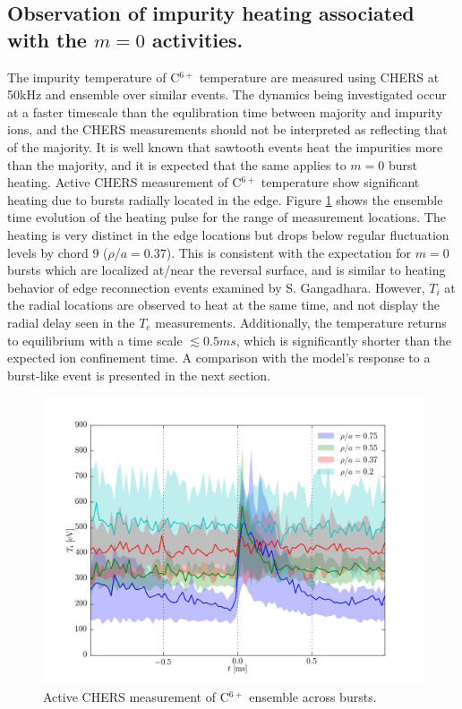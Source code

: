 \begin{refsection}
\section{Observation of impurity heating associated with the $m = 0$ activities.}

The impurity temperature of C$^{6+}$ temperature are measured using CHERS at 50kHz and ensemble over similar events.
The dynamics being investigated occur at a faster timescale than the equlibration time between majority and impurity ions, and the CHERS measurements should not be interpreted as reflecting that of the majority. It is well known that sawtooth events heat the impurities more than the majority, and it is expected that the same applies to $m = 0$ burst heating.
Active CHERS measurement of C$^{6+}$ temperature show significant heating due to bursts radially located in the edge. Figure \ref{fig:m0_heating} shows the ensemble time evolution of the heating pulse for the range of measurement locations. The heating is very distinct in the edge locations but drops below regular fluctuation levels by chord 9 ($\rho/a = 0.37$). This is consistent with the expectation for $m = 0$ bursts which are localized at/near the reversal surface, and is similar to heating behavior of edge reconnection events examined by S. Gangadhara\cite{Gangadhara2008}. However, $T_i$ at the radial locations are observed to heat at the same time, and not display the radial delay seen in the $T_e$ measurements. Additionally, the temperature returns to equilibrium with a time scale $\lesssim 0.5ms$, which is significantly shorter than the expected ion confinement time. A comparison with the model's response to a burst-like event is presented in the next section.

\begin{figure}
	\centering
	\includegraphics[width = 1.\linewidth]{./m0_and_impurity_heating/burst_heating_c6.png}
	\caption{Active CHERS measurement of C$^{6+}$ ensemble across bursts.}\label{fig:m0_heating}
\end{figure}


\end{refsection}
